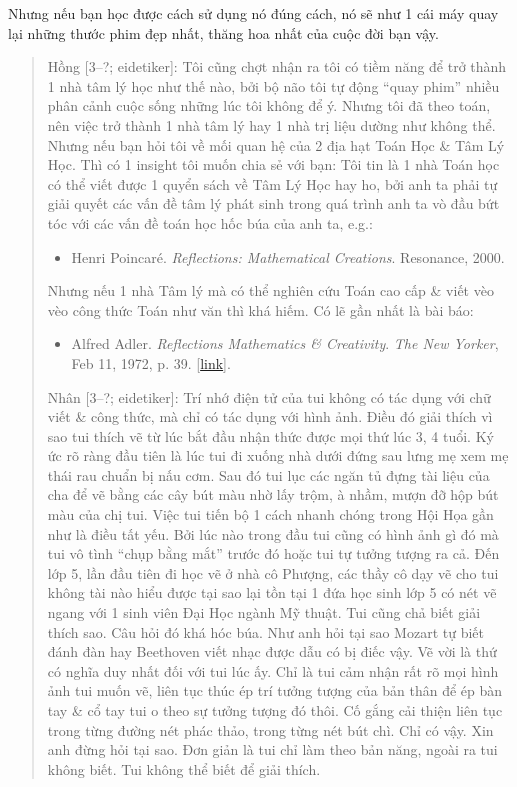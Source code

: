 \documentclass[12pt,oneside]{book}
\begin{document}
Nhưng nếu bạn học được cách sử dụng nó đúng cách, nó sẽ như 1 cái máy quay lại những thước phim đẹp nhất, thăng hoa nhất của cuộc đời bạn vậy.
\begin{quote}
	{\sf Hồng [3--?; eidetiker]}: Tôi cũng chợt nhận ra tôi có tiềm năng để trở thành 1 nhà tâm lý học như thế nào, bởi bộ não tôi tự động ``quay phim'' nhiều phân cảnh cuộc sống những lúc tôi không để ý. Nhưng tôi đã theo toán, nên việc trở thành 1 nhà tâm lý hay 1 nhà trị liệu dường như không thể. Nhưng nếu bạn hỏi tôi về mối quan hệ của 2 địa hạt Toán Học \& Tâm Lý Học. Thì có 1 insight tôi muốn chia sẻ với bạn: Tôi tin là 1 nhà Toán học có thể viết được 1 quyển sách về Tâm Lý Học hay ho, bởi anh ta phải tự giải quyết các vấn đề tâm lý phát sinh trong quá trình anh ta vò đầu bứt tóc với các vấn đề toán học hốc búa của anh ta, e.g.:
	\begin{itemize}
		\item {\sc Henri Poincar\'e}. {\it Reflections: Mathematical Creations}. Resonance, 2000.
	\end{itemize}
	Nhưng nếu 1 nhà Tâm lý mà có thể nghiên cứu Toán cao cấp \& viết vèo vèo công thức Toán như văn thì khá hiếm. Có lẽ gần nhất là bài báo:
	\begin{itemize}
		\item {\sc Alfred Adler}. {\it Reflections Mathematics \& Creativity}. {\it The New Yorker}, Feb 11, 1972, p. 39. [\href{https://www.newyorker.com/magazine/1972/02/19/reflections-mathematics-and-creativity}{link}].
	\end{itemize}
	{\sf Nhân [3--?; eidetiker]}: Trí nhớ điện tử của tui không có tác dụng với chữ viết \& công thức, mà chỉ có tác dụng với hình ảnh. Điều đó giải thích vì sao tui thích vẽ từ lúc bắt đầu nhận thức được mọi thứ lúc 3, 4 tuổi. Ký ức rõ ràng đầu tiên là lúc tui đi xuống nhà dưới đứng sau lưng mẹ xem mẹ thái rau chuẩn bị nấu cơm. Sau đó tui lục các ngăn tủ đựng tài liệu của cha để vẽ bằng các cây bút màu nhờ lấy trộm, à nhầm, mượn đỡ hộp bút màu của chị tui. Việc tui tiến bộ 1 cách nhanh chóng trong Hội Họa gần như là điều tất yếu. Bởi lúc nào trong đầu tui cũng có hình ảnh gì đó mà tui vô tình ``chụp bằng mắt'' trước đó hoặc tui tự tưởng tượng ra cả. Đến lớp 5, lần đầu tiên đi học vẽ ở nhà cô Phượng, các thầy cô dạy vẽ cho tui không tài nào hiểu được tại sao lại tồn tại 1 đứa học sinh lớp 5 có nét vẽ ngang với 1 sinh viên Đại Học ngành Mỹ thuật. Tui cũng chả biết giải thích sao. Câu hỏi đó khá hóc búa. Như anh hỏi tại sao {\sc Mozart} tự biết đánh đàn hay {\sc Beethoven} viết nhạc được dẫu có bị điếc vậy. Vẽ vời là thứ có nghĩa duy nhất đối với tui lúc ấy. Chỉ là tui cảm nhận rất rõ mọi hình ảnh tui muốn vẽ, liên tục thúc ép trí tưởng tượng của bản thân để ép bàn tay \& cổ tay tui o theo sự tưởng tượng đó thôi. Cố gắng cải thiện liên tục trong từng đường nét phác thảo, trong từng nét bút chì. Chỉ có vậy. Xin anh đừng hỏi tại sao. Đơn giản là tui chỉ làm theo bản năng, ngoài ra tui không biết. Tui không thể biết để giải thích.
	

\end{quote}
\end{document}
